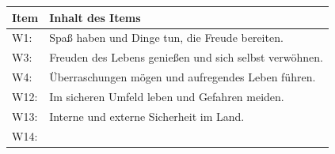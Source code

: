 \documentclass[12pt,ngerman,]{book}
\theoremstyle{definition}
\theoremstyle{definition}
\theoremstyle{remark}
\begin{document}
\begin{longtable}[]{@{}ll@{}}
\toprule
\begin{minipage}[b]{0.08\columnwidth}\raggedright\strut
Item\strut
\end{minipage} & \begin{minipage}[b]{0.86\columnwidth}\raggedright\strut
Inhalt des Items\strut
\end{minipage}\tabularnewline
\midrule
\endhead
\begin{minipage}[t]{0.08\columnwidth}\raggedright\strut
W1:\strut
\end{minipage} & \begin{minipage}[t]{0.86\columnwidth}\raggedright\strut
Spaß haben und Dinge tun, die Freude bereiten.\strut
\end{minipage}\tabularnewline
\begin{minipage}[t]{0.08\columnwidth}\raggedright\strut
W3:\strut
\end{minipage} & \begin{minipage}[t]{0.86\columnwidth}\raggedright\strut
Freuden des Lebens genießen und sich selbst verwöhnen.\strut
\end{minipage}\tabularnewline
\begin{minipage}[t]{0.08\columnwidth}\raggedright\strut
W4:\strut
\end{minipage} & \begin{minipage}[t]{0.86\columnwidth}\raggedright\strut
Überraschungen mögen und aufregendes Leben führen.\strut
\end{minipage}\tabularnewline
\begin{minipage}[t]{0.08\columnwidth}\raggedright\strut
W12:\strut
\end{minipage} & \begin{minipage}[t]{0.86\columnwidth}\raggedright\strut
Im sicheren Umfeld leben und Gefahren meiden.\strut
\end{minipage}\tabularnewline
\begin{minipage}[t]{0.08\columnwidth}\raggedright\strut
W13:\strut
\end{minipage} & \begin{minipage}[t]{0.86\columnwidth}\raggedright\strut
Interne und externe Sicherheit im Land.\strut
\end{minipage}\tabularnewline
\begin{minipage}[t]{0.08\columnwidth}\raggedright\strut
W14:\strut
\end{minipage} & \begin{minipage}[t]{0.86\columnwidth}\raggedright\strut

\end{minipage}
\end{longtable}
\end{document}
